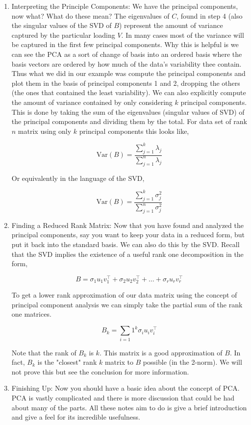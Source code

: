 \documentclass{article}
\begin{document}
\begin{enumerate}
\item Interpreting the Principle Components: We have the principal components, now what? What do these mean? The eigenvalues of $C$, found in step 4 (also the singular values of the SVD of $B$) represent the amount of variance captured by the particular loading $V$. In many cases most of the variance will be captured in the first few principal components. Why this is helpful is we can see the PCA as a sort of change of basis into an ordered basis where the basis vectors are ordered by how much of the data's variability thee contain. Thus what we did in our example was compute the principal components and plot them in the basis of principal components 1 and 2, dropping the others (the ones that contained the least variability). We can also explicitly compute the amount of variance contained by only considering $k$ principal components. This is done by taking the sum of the eigenvalues (singular values of SVD) of the principal components and dividing them by the total. For data set of rank $n$ matrix using only $k$ principal components this looks like,


$$\text{Var}(B)=\frac{\sum_{j=1}^{k}\lambda_j}{\sum_{j=1}^{n}\lambda_j}$$

Or equivalently in the language of the SVD,

$$\text{Var}(B)=\frac{\sum_{j=1}^{k}\sigma^2_j}{\sum_{j=1}^{n}\sigma^2_j}$$

\item Finding a Reduced Rank Matrix: Now that you have found and analyzed the principal components, say you want to keep your data in a reduced form, but put it back into the standard basis. We can also do this by the SVD. Recall that the SVD implies the existence of a useful rank one decomposition in the form,

$$B=\sigma_1u_1v^\top_1+\sigma_2u_2v^\top_2+\dots+\sigma_ru_rv^\top_r$$

To get a lower rank approximation of our data matrix using the concept of principal component analysis we can simply take the partial sum of the rank one matrices.

$$B_k=\sum_{i=1}1^k\sigma_iu_iv^\top_i$$

Note that the rank of $B_k$ is $k$. This matrix is a good approximation of $B$. In fact, $B_k$ is the "closest" rank $k$ matrix to $B$ possible (in the 2-norm). We will not prove this but see the conclusion for more information.

\item Finishing Up: Now you should have a basic idea about the concept of PCA. PCA is vastly complicated and there is more discussion that could be had about many of the parts. All these notes aim to do is give a brief introduction and give a feel for its incredible usefulness. 
\end{enumerate}
\end{document}
